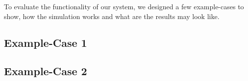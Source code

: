 To evaluate the functionality of our system, we designed a few example-cases to show, how the simulation works and what are the results may look like.

\subsection{Example-Case 1}


\subsection{Example-Case 2}